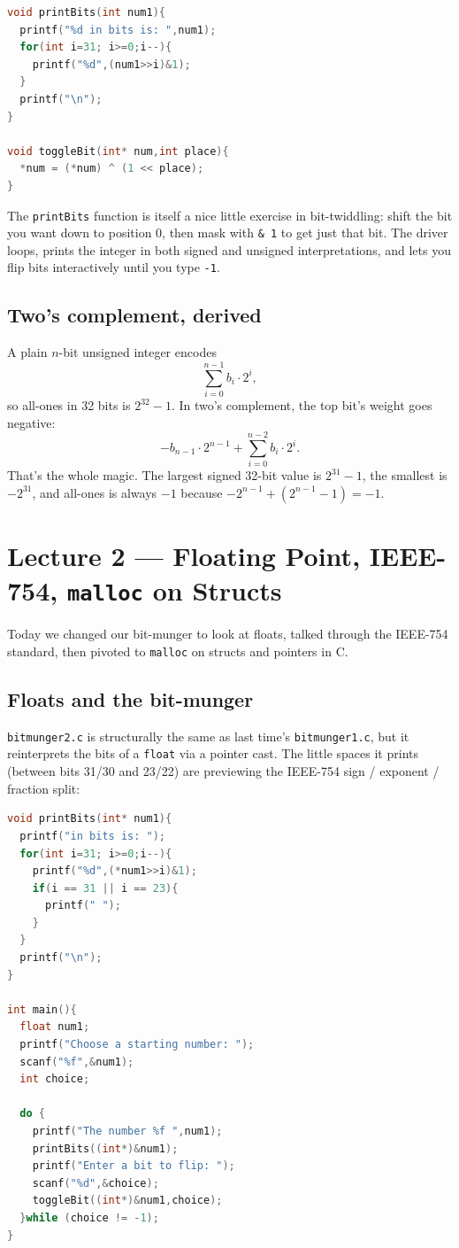 \documentclass[11pt]{article}
\begin{document}
\begin{lstlisting}[language=C]
void printBits(int num1){
  printf("%d in bits is: ",num1);
  for(int i=31; i>=0;i--){
    printf("%d",(num1>>i)&1);
  }
  printf("\n");
}

void toggleBit(int* num,int place){
  *num = (*num) ^ (1 << place);
}
\end{lstlisting}

The \texttt{printBits} function is itself a nice little exercise in
bit-twiddling: shift the bit you want down to position 0, then mask
with \texttt{\& 1} to get just that bit. The driver loops, prints
the integer in both signed and unsigned interpretations, and lets
you flip bits interactively until you type \texttt{-1}.

\subsection*{Two's complement, derived}

A plain $n$-bit unsigned integer encodes
\[
  \sum_{i=0}^{n-1} b_i \cdot 2^i,
\]
so all-ones in 32 bits is $2^{32}-1$. In two's complement, the top
bit's weight goes negative:
\[
  -b_{n-1} \cdot 2^{n-1} + \sum_{i=0}^{n-2} b_i \cdot 2^i.
\]
That's the whole magic. The largest signed 32-bit value is
$2^{31}-1$, the smallest is $-2^{31}$, and all-ones is always $-1$
because $-2^{n-1} + (2^{n-1} - 1) = -1$.

\section{Lecture 2 --- Floating Point, IEEE-754, \texttt{malloc} on Structs}

Today we changed our bit-munger to look at floats, talked through
the IEEE-754 standard, then pivoted to \texttt{malloc} on structs
and pointers in C.

\subsection*{Floats and the bit-munger}

\texttt{bitmunger2.c} is structurally the same as last time's
\texttt{bitmunger1.c}, but it reinterprets the bits of a
\texttt{float} via a pointer cast. The little spaces it prints
(between bits 31/30 and 23/22) are previewing the IEEE-754
sign / exponent / fraction split:

\begin{lstlisting}[language=C]
void printBits(int* num1){
  printf("in bits is: ");
  for(int i=31; i>=0;i--){
    printf("%d",(*num1>>i)&1);
    if(i == 31 || i == 23){
      printf(" ");
    }
  }
  printf("\n");
}

int main(){
  float num1;
  printf("Choose a starting number: ");
  scanf("%f",&num1);
  int choice;

  do {
    printf("The number %f ",num1);
    printBits((int*)&num1);
    printf("Enter a bit to flip: ");
    scanf("%d",&choice);
    toggleBit((int*)&num1,choice);
  }while (choice != -1);
}
\end{lstlisting}
\end{document}
